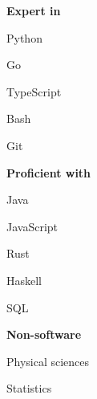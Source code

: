 \documentclass[]{resume}
\begin{document}
\begin{minipage}[t]{0.33\textwidth}
\textbf{Expert in}
\vspace{\topsep} %
\begin{tightemize}
\item Python
\item Go
\item TypeScript
\item Bash
\item Git
\end{tightemize}
\sectionsep

\textbf{Proficient with}
\begin{tightemize}
\item Java
\item JavaScript
\item Rust
\item Haskell
\item SQL
\end{tightemize}
\sectionsep

\textbf{Non-software}
\begin{tightemize}
\item Physical sciences
\item Statistics
\end{tightemize}
\sectionsep


\end{minipage}
\hfill
\end{document}
